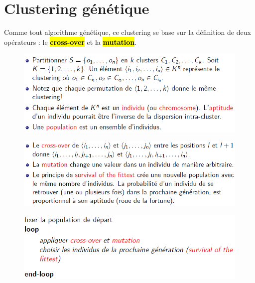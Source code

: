 \documentclass[letterpaper, 12pt]{article}
\newcommand{\alinea}{
\hspace*{0.5cm}}
\begin{document}
	\section{Clustering génétique}
		\alinea Comme tout algorithme génétique, ce
			clustering se base sur la définition de deux
			opérateurs : le \textbf{\hl{cross-over}} et 
			la \textbf{\hl{mutation}}.
		\begin{figure}[H]
			\centering
			\includegraphics[scale=0.65]{Images/genetic_principle.png}
		\end{figure}\noindent
		\begin{figure}[H]
			\centering
			\includegraphics[scale=0.65]{Images/genetic_operators.png}
		\end{figure}\noindent
		\begin{figure}[H]
			\centering
			\includegraphics[scale=0.65]{Images/genetic_algo.png}
		\end{figure}\noindent
	\newpage
\end{document}
